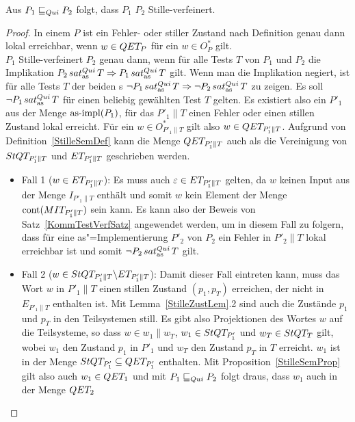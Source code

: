 \begin{Satz}
  \label{StilleTestVerfSatz}
  Aus $P_1 \sqsubseteq  _{Qui} P_2$ folgt, dass $P_1$ $P_2$ Stille-verfeinert.
\end{Satz}
\begin{proof}
  In einem \MEIO{} $P$ ist ein Fehler- oder stiller Zustand nach Definition
  genau dann lokal erreichbar, wenn $w\in QET _P$ für ein $w\in O_P^*$ gilt.\\
  $P_1$ Stille-verfeinert $P_2$ genau dann, wenn für alle Tests $T$ von $P_1$
  und $P_2$ die Implikation $P_2\hspace{0.05cm}sat_\mathrm{as}^{Qui}\hspace{0.05cm} T \Rightarrow P_1\hspace{0.05cm}sat_\mathrm{as}^{Qui}\hspace{0.05cm} T$ gilt. Wenn
  man die Implikation negiert, ist für alle Tests $T$ der beiden \MEIO{}s $\neg
  P_1\hspace{0.05cm}sat_\mathrm{as}^{Qui}\hspace{0.05cm} T \Rightarrow \neg P_2\hspace{0.05cm}sat_\mathrm{as}^{Qui}\hspace{0.05cm} T$ zu zeigen. Es soll $\neg P_1
  \hspace{0.05cm}sat_\mathrm{as}^{Qui}\hspace{0.05cm} T$ für einen beliebig gewählten Test $T$ gelten. Es existiert also
  ein $P'_1$ aus der Menge $\mathrm{as}\text{-}\mathrm{impl} (P_1)$, für das $P'_1\|T$ einen Fehler oder
  einen stillen Zustand lokal erreicht. Für ein $w\in O_{P'_1\|T}^*$ gilt also
  $w\in QET _{P'_1\|T}$. Aufgrund von Definition~\ref{StilleSemDef} kann die
  Menge $QET _{P'_1\|T}$ auch als die Vereinigung von $StQT _{P'_1\|T}$ und
  $ET _{P'_1\|T}$ geschrieben werden.
  \begin{itemize}
    \item Fall 1 \big($w\in ET _{P'_1\|T}$\big): Es muss auch $\varepsilon\in
      ET _{P'_1\|T}$ gelten, da $w$ keinen Input aus der Menge $I _{P'_1\|T}$
      enthält und somit $w$ kein Element der Menge $\mathrm{cont} (MIT _{P'_1\|T})$
      sein kann. Es kann also der Beweis von Satz~\ref{KommTestVerfSatz}
      angewendet werden, um in diesem Fall zu folgern, dass für eine
      as"=Implementierung $P'_2$ von $P_2$ ein Fehler in $P'_2\|T$ lokal
      erreichbar ist und somit $\neg P_2\hspace{0.05cm}sat_\mathrm{as}^{Qui}\hspace{0.05cm} T$ gilt.
    \item Fall 2 \big($w\in StQT _{P'_1\|T}\backslash ET _{P'_1\|T}$\big):
      Damit dieser Fall eintreten kann, muss das Wort $w$ in $P'_1\|T$ einen
      stillen Zustand $(p_1,p_T)$ erreichen, der nicht in $E_{P'_1\|T}$
      enthalten ist. Mit Lemma~\ref{StilleZustLem}.2 sind auch die Zustände
      $p_1$ und $p_T$ in den Teilsystemen still. Es gibt also Projektionen des
      Wortes $w$ auf die Teilsysteme, so dass $w\in w_1\|w_T$, $w_1\in StQT
      _{P'_1}$ und $w_T\in StQT _T$ gilt, wobei $w_1$ den Zustand $p_1$ in
      $P'_1$ und $w_T$ den Zustand $p_T$ in $T$ erreicht. $w_1$ ist in der
      Menge $StQT _{P'_1} \subseteq QET _{P'_1}$ enthalten. Mit
      Proposition~\ref{StilleSemProp} gilt also auch $w_1\in QET _1$ und mit
      $P_1 \sqsubseteq  _{Qui} P_2$ folgt draus, dass $w_1$ auch in der Menge $QET _2$

\end{itemize}
\end{proof}
